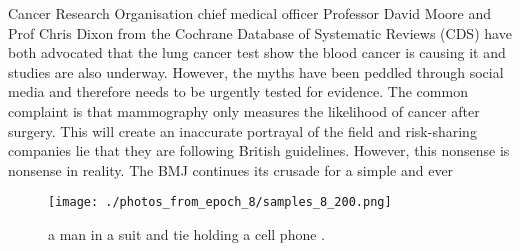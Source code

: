 \documentclass{article}%
\begin{document}
Cancer Research Organisation chief medical officer Professor David Moore and Prof Chris Dixon from the Cochrane Database of Systematic Reviews (CDS) have both advocated that the lung cancer test show the blood cancer is causing it and studies are also underway. However, the myths have been peddled through social media and therefore needs to be urgently tested for evidence.\newline%
The common complaint is that mammography only measures the likelihood of cancer after surgery. This will create an inaccurate portrayal of the field and risk{-}sharing companies lie that they are following British guidelines. However, this nonsense is nonsense in reality. The BMJ continues its crusade for a simple and ever

%


\begin{figure}[h!]%
\centering%
\texttt{[image: ./photos\_from\_epoch\_8/samples\_8\_200.png]}%
\caption{a man in a suit and tie holding a cell phone .}%
\end{figure}

%
\end{document}
